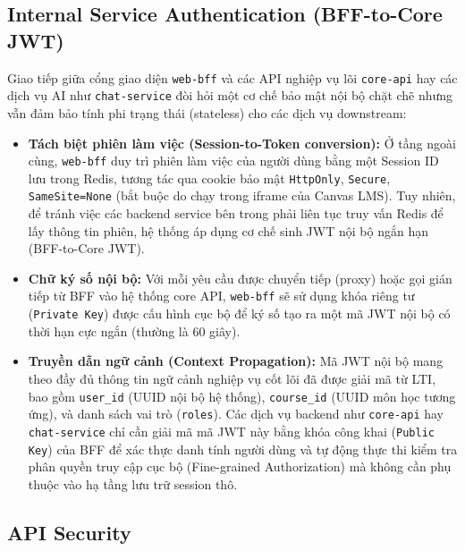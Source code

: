 \subsection{Internal Service Authentication (BFF-to-Core JWT)}

Giao tiếp giữa cổng giao diện \texttt{web-bff} và các API nghiệp vụ lõi
\texttt{core-api} hay các dịch vụ AI như \texttt{chat-service} đòi hỏi
một cơ chế bảo mật nội bộ chặt chẽ nhưng vẫn đảm bảo tính phi trạng thái
(stateless) cho các dịch vụ downstream:

\begin{itemize}
    \item \textbf{Tách biệt phiên làm việc (Session-to-Token conversion):}
          Ở tầng ngoài cùng, \texttt{web-bff} duy trì phiên làm việc của
          người dùng bằng một Session ID lưu trong Redis, tương tác qua
          cookie bảo mật \texttt{HttpOnly}, \texttt{Secure},
          \texttt{SameSite=None} (bắt buộc do chạy trong iframe của Canvas
          LMS). Tuy nhiên, để tránh việc các backend service bên trong
          phải liên tục truy vấn Redis để lấy thông tin phiên, hệ thống
          áp dụng cơ chế sinh JWT nội bộ ngắn hạn (BFF-to-Core JWT).
    \item \textbf{Chữ ký số nội bộ:} Với mỗi yêu cầu được chuyển tiếp
          (proxy) hoặc gọi gián tiếp từ BFF vào hệ thống core API,
          \texttt{web-bff} sẽ sử dụng khóa riêng tư (\texttt{Private Key})
          được cấu hình cục bộ để ký số tạo ra một mã JWT nội bộ có thời
          hạn cực ngắn (thường là 60 giây).
    \item \textbf{Truyền dẫn ngữ cảnh (Context Propagation):} Mã JWT nội
          bộ mang theo đầy đủ thông tin ngữ cảnh nghiệp vụ cốt lõi đã được
          giải mã từ LTI, bao gồm \texttt{user\_id} (UUID nội bộ hệ thống),
          \texttt{course\_id} (UUID môn học tương ứng), và danh sách vai
          trò (\texttt{roles}). Các dịch vụ backend như \texttt{core-api}
          hay \texttt{chat-service} chỉ cần giải mã mã JWT này bằng khóa
          công khai (\texttt{Public Key}) của BFF để xác thực danh tính
          người dùng và tự động thực thi kiểm tra phân quyền truy cập cục
          bộ (Fine-grained Authorization) mà không cần phụ thuộc vào hạ
          tầng lưu trữ session thô.
\end{itemize}

\subsection{API Security}

